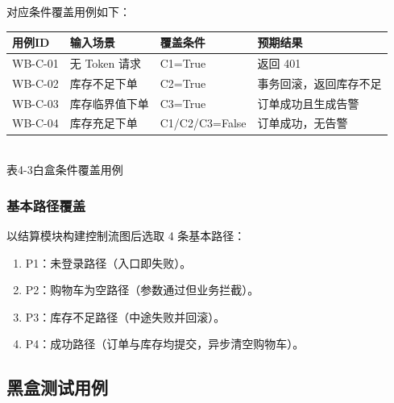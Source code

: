 对应条件覆盖用例如下：
\begin{center}
  \renewcommand{\arraystretch}{1.35}
  \begin{tabular}{|>{\centering\arraybackslash}m{1.8cm}|>{\centering\arraybackslash}m{3.3cm}|>{\centering\arraybackslash}m{3.0cm}|>{\centering\arraybackslash}m{3.5cm}|}
    \hline
    \textbf{用例ID} & \textbf{输入场景} & \textbf{覆盖条件} & \textbf{预期结果} \\ \hline
    WB-C-01 & 无 Token 请求 & C1=True & 返回 401 \\ \hline
    WB-C-02 & 库存不足下单 & C2=True & 事务回滚，返回库存不足 \\ \hline
    WB-C-03 & 库存临界值下单 & C3=True & 订单成功且生成告警 \\ \hline
    WB-C-04 & 库存充足下单 & C1/C2/C3=False & 订单成功，无告警 \\ \hline
  \end{tabular}
  \\[0.3em]
  {表4-3\quad 白盒条件覆盖用例}
\end{center}

\subsubsection{基本路径覆盖}
以结算模块构建控制流图后选取 4 条基本路径：
\begin{enumerate}[leftmargin=2em]
  \item P1：未登录路径（入口即失败）。
  \item P2：购物车为空路径（参数通过但业务拦截）。
  \item P3：库存不足路径（中途失败并回滚）。
  \item P4：成功路径（订单与库存均提交，异步清空购物车）。
\end{enumerate}

\subsection{黑盒测试用例}

